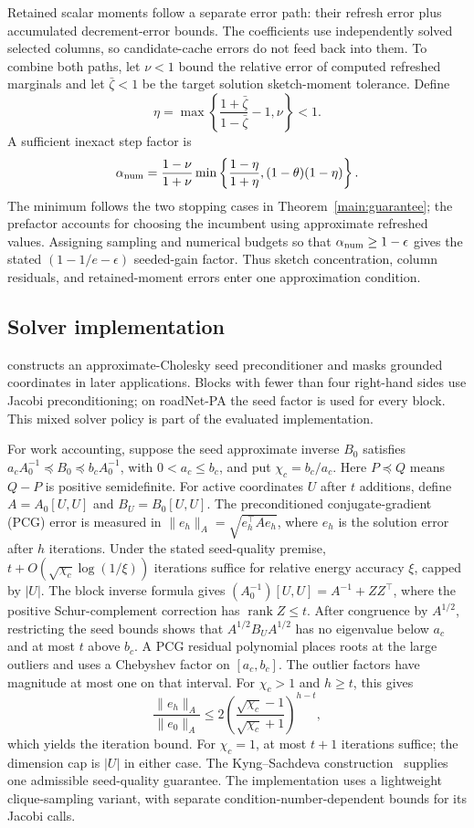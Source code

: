 Retained scalar moments follow a separate error path: their refresh
error plus accumulated decrement-error bounds. The coefficients use
independently solved selected columns, so candidate-cache errors do
not feed back into them. To combine both paths, let $\nu<1$ bound
the relative error of computed refreshed marginals and let
$\bar\zeta<1$ be the target solution sketch-moment tolerance. Define
\[
 \eta=\max\left\{\frac{1+\bar\zeta}{1-\bar\zeta}-1,\nu\right\}<1.
\]
A sufficient inexact step factor is
\[
 \alpha_{\rm num}=\frac{1-\nu}{1+\nu}
 \min\left\{\frac{1-\eta}{1+\eta},(1-\theta)(1-\eta)\right\}.
\]
The minimum follows the two stopping cases in
Theorem~\ref{main:guarantee}; the prefactor accounts for choosing
the incumbent using approximate refreshed values.
Assigning sampling and numerical budgets so that
$\alpha_{\rm num}\geq1-\epsilon$ gives the stated
$(1-1/e-\epsilon)$ seeded-gain factor. Thus sketch concentration,
column residuals, and retained-moment errors enter one approximation
condition.

\subsection{Solver implementation}
\alg{} constructs an approximate-Cholesky seed preconditioner and
masks grounded coordinates in later applications. Blocks with fewer
than four right-hand sides use Jacobi preconditioning; on roadNet-PA
the seed factor is used for every block. This mixed solver policy is
part of the evaluated implementation.

For work accounting, suppose the seed approximate inverse $B_0$
satisfies $a_cA_0^{-1}\preceq B_0\preceq b_cA_0^{-1}$, with
$0<a_c\leq b_c$, and put $\chi_c=b_c/a_c$.
Here $P\preceq Q$ means $Q-P$ is positive semidefinite.
For active coordinates $U$ after $t$ additions, define
$A=A_0[U,U]$ and $B_U=B_0[U,U]$.
The preconditioned conjugate-gradient (PCG) error is measured in
$\|e_h\|_A=\sqrt{e_h^\top Ae_h}$, where $e_h$ is the solution
error after $h$ iterations. Under the stated seed-quality premise,
$t+O(\sqrt{\chi_c}\log(1/\xi))$ iterations suffice for relative
energy accuracy $\xi$, capped by $|U|$.
The block inverse formula gives
$(A_0^{-1})[U,U]=A^{-1}+ZZ^\top$, where the positive
Schur-complement correction has $\operatorname{rank}Z\leq t$.
After congruence by $A^{1/2}$, restricting the seed bounds shows
that $A^{1/2}B_UA^{1/2}$ has no eigenvalue below $a_c$ and at
most $t$ above $b_c$. A PCG residual polynomial places roots at
the large outliers and uses a Chebyshev factor on $[a_c,b_c]$.
The outlier factors have magnitude at most one on that interval.
For $\chi_c>1$ and $h\geq t$, this gives
\[
 \frac{\|e_h\|_A}{\|e_0\|_A}
 \leq2\left(\frac{\sqrt{\chi_c}-1}{\sqrt{\chi_c}+1}\right)^{h-t},
\]
which yields the iteration bound. For $\chi_c=1$, at most $t+1$
iterations suffice; the dimension cap is $|U|$ in either case.
The Kyng--Sachdeva construction~\cite{kyng2016} supplies one
admissible seed-quality guarantee. The implementation uses a lightweight
clique-sampling variant, with separate condition-number-dependent
bounds for its Jacobi calls.

